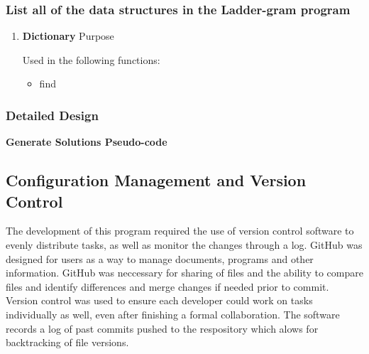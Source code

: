 \documentclass[12pt, a4]{report}
\begin{document}

	
	\subsubsection{List all of the data structures in the Ladder-gram program}
		\begin{enumerate}
				\item
					\textbf{Dictionary}
					\textbar{} Purpose
					\par Used in the following functions:
					\begin{itemize}
						\item find
					\end{itemize}
		\end{enumerate}
	

	\subsubsection{Detailed Design}
	
	
	\textbf{Generate Solutions Pseudo-code}
	

	
	\pagebreak
	\subsection{Configuration Management and Version Control}
		\par 
		The development of this program required the use of version control software to evenly distribute tasks, as well as monitor the changes through a log. GitHub was designed for users as a way to manage documents, programs and other information. GitHub was neccessary for sharing of files and the ability to compare files and identify differences and merge changes if needed prior to commit. Version control was used to ensure each developer could work on tasks individually as well, even after finishing a formal collaboration. The software records a log of past commits pushed to the respository which alows for backtracking of file versions.
	
\end{document}

